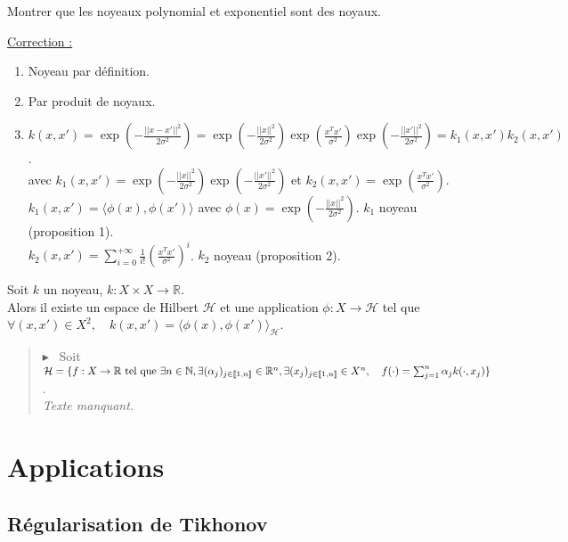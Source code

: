 \documentclass[12pt,a4paper]{article}
\newcommand{\theoreme}[2]{%
    \begin{tcolorbox}[colback=white,colframe=red!25!white,title=\textbf{Théorème #1}, coltitle=black]
        #2
    \end{tcolorbox}
}
\newcommand{\preuve}[1]{%
    \begin{quote}
        $\blacktriangleright$~#1
    \end{quote}
}
\begin{document}
Montrer que les noyeaux polynomial et exponentiel sont des noyaux. \\

\color{blue}

\noindent\underline{Correction :}
\begin{enumerate}
    \item Noyeau par définition.
    \item Par produit de noyaux.
    \item $k(x, x') = \exp(-\frac{||x - x'||^2}{2\sigma^2}) = \exp(-\frac{||x||^2}{2\sigma^2}) \exp(\frac{x^T x'}{\sigma^2}) \exp(-\frac{||x'||^2}{2\sigma^2}) = k_1(x, x') k_2(x, x')$. \\
    avec $k_1(x, x') = \exp(-\frac{||x||^2}{2\sigma^2}) \exp(-\frac{||x'||^2}{2\sigma^2})$ et $k_2(x, x') = \exp(\frac{x^T x'}{\sigma^2})$. \\

    $k_1(x, x') = \langle \phi(x), \phi(x') \rangle$ avec $\phi(x) = \exp(-\frac{||x||^2}{2\sigma^2})$. $k_1$ noyeau (proposition 1). \\
    $k_2(x, x') = \sum_{i=0}^{+\infty} \frac{1}{i!} \left(\frac{x^T x'}{\sigma^2}\right)^i$. $k_2$ noyeau (proposition 2).
\end{enumerate}

\color{black}


\theoreme{de Moore-Aronszajn}{
    Soit $k$ un noyeau, $k : X \times X \longrightarrow \mathbb{R}$. \\
    Alors il existe un espace de Hilbert $\mathcal{H}$ et une application $\phi : X \longrightarrow \mathcal{H}$ tel que $\forall (x, x') \in X^2, \quad k(x, x') = \langle \phi(x), \phi(x') \rangle_{\mathcal{H}}$.
}


\preuve{
    Soit $\mathcal{H} = \{f : X \rightarrow \mathbb{R} \text{ tel que } \exists n \in \mathbb{N}, \exists (\alpha_j)_{j \in \llbracket 1, n \rrbracket} \in \mathbb{R}^n, \\
    \exists (x_j)_{j \in \llbracket 1, n \rrbracket} \in X^n, \quad f(\cdot) = \sum_{j=1}^n \alpha_j k(\cdot, x_j)\}$. \\


    \textit{Texte manquant.}
}




\section{Applications}

\subsection{Régularisation de Tikhonov}
\end{document}
